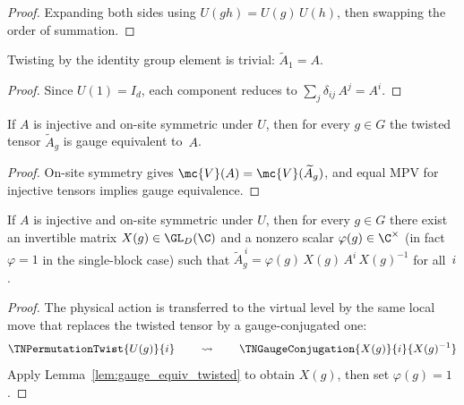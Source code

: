 \begin{proof}\leanok{}
    Expanding both sides using $U(gh) = U(g)\, U(h)$, then swapping
    the order of summation.
\end{proof}

\begin{lemma}\label{lem:twisted_tensor_one}
    \leanok
    Twisting by the identity group element is trivial:
    $\widetilde{A}_1 = A$.
\end{lemma}

\begin{proof}\leanok{}
    Since $U(1) = I_d$, each component reduces to
    $\sum_j \delta_{ij}\, A^j = A^i$.
\end{proof}

\begin{lemma}%
    \label{lem:gauge_equiv_twisted}
    \leanok
    If $A$ is injective and on-site symmetric under $U$, then
    for every $g \in G$ the twisted tensor $\widetilde{A}_g$ is
    gauge equivalent to~$A$.
\end{lemma}

\begin{proof}\leanok{}
    On-site symmetry gives
    $\mc{V}(A) = \mc{V}(\widetilde{A}_g)$, and equal MPV
    for injective tensors implies gauge equivalence.
\end{proof}

\begin{theorem}\label{thm:virtual_symmetry_eq}
    \leanok
    If $A$ is injective and on-site symmetric under $U$, then
    for every $g \in G$ there exist an invertible matrix $X(g) \in \GL_D(\C)$
    and a nonzero scalar $\varphi(g) \in \C^{\times}$ (in fact $\varphi = 1$
    in the single-block case) such that
    $\widetilde{A}_g^{\,i} = \varphi(g)\, X(g)\, A^i\, X(g)^{-1}$ for all~$i$.
\end{theorem}

\begin{proof}\leanok{}
    The physical action is transferred to the virtual level by the same
    local move that replaces the twisted tensor by a gauge-conjugated one:
    \[
        \TNPermutationTwist{U(g)}{i}
        \qquad\leadsto\qquad
        \TNGaugeConjugation{X(g)}{i}{X(g)^{-1}}
    \]
    Apply Lemma~\ref{lem:gauge_equiv_twisted} to obtain $X(g)$, then
    set $\varphi(g) = 1$.
\end{proof}

